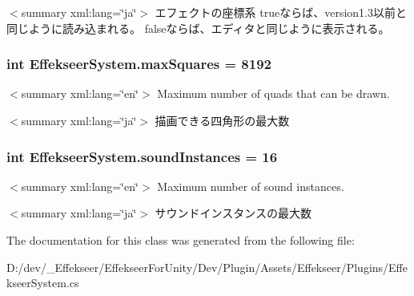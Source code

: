$<$summary xml\-:lang=\char`\"{}ja\char`\"{}$>$ エフェクトの座標系 trueならば、version1.3以前と同じように読み込まれる。 falseならば、エディタと同じように表示される。 \hypertarget{class_effekseer_system_a2007e297eab6bc504cce40650679b1c4}{
\subsubsection[{max\-Squares}]{\setlength{\rightskip}{0pt plus 5cm}int Effekseer\-System.\-max\-Squares = 8192}}\label{class_effekseer_system_a2007e297eab6bc504cce40650679b1c4}
$<$summary xml\-:lang=\char`\"{}en\char`\"{}$>$ Maximum number of quads that can be drawn. 

$<$summary xml\-:lang=\char`\"{}ja\char`\"{}$>$ 描画できる四角形の最大数 \hypertarget{class_effekseer_system_ac83155c54d94fc6b61f6f53032923667}{
\subsubsection[{sound\-Instances}]{\setlength{\rightskip}{0pt plus 5cm}int Effekseer\-System.\-sound\-Instances = 16}}\label{class_effekseer_system_ac83155c54d94fc6b61f6f53032923667}
$<$summary xml\-:lang=\char`\"{}en\char`\"{}$>$ Maximum number of sound instances. 

$<$summary xml\-:lang=\char`\"{}ja\char`\"{}$>$ サウンドインスタンスの最大数 

The documentation for this class was generated from the following file\-:\begin{DoxyCompactItemize}
\item 
D\-:/dev/\-\_\-\-Effekseer/\-Effekseer\-For\-Unity/\-Dev/\-Plugin/\-Assets/\-Effekseer/\-Plugins/Effekseer\-System.\-cs\end{DoxyCompactItemize}
